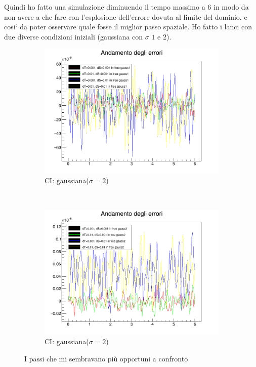 Quindi ho fatto una simulazione diminuendo il tempo massimo a $6$ in modo da non avere a che fare con l'esplosione dell'errore dovuta al limite del dominio. e cosi` da poter osservare quale fosse il miglior passo spaziale. Ho fatto i lanci con due diverse condizioni iniziali (gaussiana con $\sigma$ $1$ e $2$). 

\begin{figure}[htb]
  \centering
  \begin{subfigure}[b]{0.45\textwidth}
    \includegraphics[width=\textwidth]{IMG/eChoosy1}
    \caption{CI: gaussiana($\sigma=2$)}
  \end{subfigure}
  ~
  \begin{subfigure}[b]{0.45\textwidth}
    \includegraphics[width=\textwidth]{IMG/eChoosy2}
    \caption{CI: gaussiana($\sigma=2$)}
  \end{subfigure}
  \caption{I passi che mi sembravano pi\`u opportuni a confronto}\label{fig:SceltaErrori}
\end{figure}

